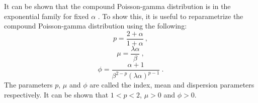 It can be shown that the compound Poisson-gamma distribution is in the exponential family for fixed $\alpha$ \citep{jorgensen1987exponential}. To show this, it is useful to reparametrize the compound Poisson-gamma distribution using the following:
\begin{equation}
  p=\frac{2+\alpha}{1+\alpha}
  \ ,
\end{equation}
\begin{equation}
  \mu=\frac{\lambda\alpha}{\beta}
  \ ,
\end{equation}
\begin{equation}
  \phi = \frac{\alpha+1}{\beta^{2-p}(\lambda\alpha)^{p-1}}
  \ .
\end{equation}
The parameters $p$, $\mu$ and $\phi$ are called the index, mean and dispersion parameters respectively. It can be shown that $1<p<2$, $\mu>0$ and $\phi>0$.

